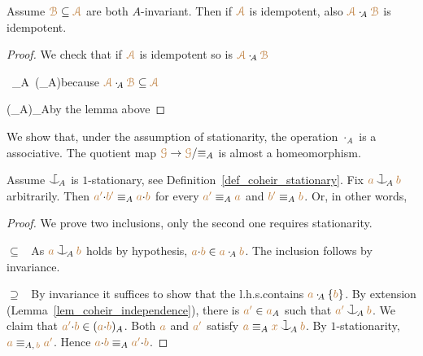 \documentclass[creche.tex]{subfiles}
\begin{document}
\begin{corollary}\label{corol_min_idempotent}
Assume ${\color{brown}\EuScript B}\subseteq{\color{brown}{\EuScript A}}$ are both $A$-invariant.
Then if ${\color{brown}{\EuScript A}}$ is idempotent,
also ${\color{brown}{\EuScript A}}\cdot_{\!A}{\color{brown}\EuScript B}$ is idempotent.
\end{corollary}
\begin{proof}
We check that if ${\color{brown}{\EuScript A}}$ is idempotent so is ${\color{brown}{\EuScript A}}\cdot_{\!A}{\color{brown}\EuScript B}$

    {\subseteq}
    {\mrA\ \cdot_{\!A}\ \big(\mrA\cdot_{\!A}\mrB\big)}\hfill because ${\color{brown}{\EuScript A}}\cdot_{\!A}{\color{brown}\EuScript B}\subseteq{\color{brown}{\EuScript A}}$

\ceq{}
    {\subseteq}
    {\big(\mrA\cdot_{\!A}\mrA\big)\cdot_{\!A}\mrB}\hfill by the lemma above

\end{proof}

We show that, under the assumption of stationarity,
the operation $\cdot_{\!A}$ is a associative.
The quotient map ${\color{brown}\EuScript G}\to{\color{brown}\EuScript G}/{\equiv_A}$ is almost a homeomorphism.


\begin{proposition}\label{prop_orbits_main}
Assume $\nonforkc_{\!A}$ is $1$-stationary,
see Definition~\ref{def_coheir_stationary}.
Fix ${\mr a}\cnonfork_{\!A}{\mr b}$ arbitrarily.
Then ${\color{brown} a'}{\cdot}{\color{brown} b'}\equiv_A{\color{brown} a}{\cdot}{\color{brown} b}$ for every ${\color{brown} a'}\equiv_A{\color{brown} a}$ and  ${\color{brown} b'}\equiv_A{\color{brown} b}$. Or, in other words,

\end{proposition}
\begin{proof} 
We prove two inclusions,
only the second one requires stationarity.

$\subseteq$ \ As ${\mr a}\cnonfork_{\!A}{\mr b}$ holds by hypothesis,
${\color{brown} a}{\cdot}{\color{brown} b}\in{\color{brown}a}\cdot_{\!A}{\color{brown} b}$.
The inclusion follows by invariance.

$\supseteq$ \ By invariance it suffices to show that 
the l.h.s.\@ contains ${\color{brown} a}\cdot_{\!A}\{{\color{brown} b}\}$.
By extension (Lemma~\ref{lem_coheir_independence}), there is ${\color{brown} a'}\in{\color{brown}a}_A$ such that ${\mr a'}\cnonfork_{\!A}{\mr b}$.
We claim that ${\color{brown} a'}{\cdot}{\color{brown} b}\in({\color{brown} a}{\cdot}{\color{brown} b})_A$.
Both ${\color{brown} a}$ and ${\color{brown} a'}$ satisfy ${\mr a}\equiv_A{\mr x}\cnonfork_{\!A}{\mr b}$.
By $1$-stationarity,
${\color{brown} a}\equiv_{A,\,{\color{brown} b}}{\color{brown} a'}$.
Hence ${\color{brown} a}{\cdot}{\color{brown} b}\equiv_A{\color{brown} a'}{\cdot}{\color{brown} b}$.
\end{proof}
\end{document}
